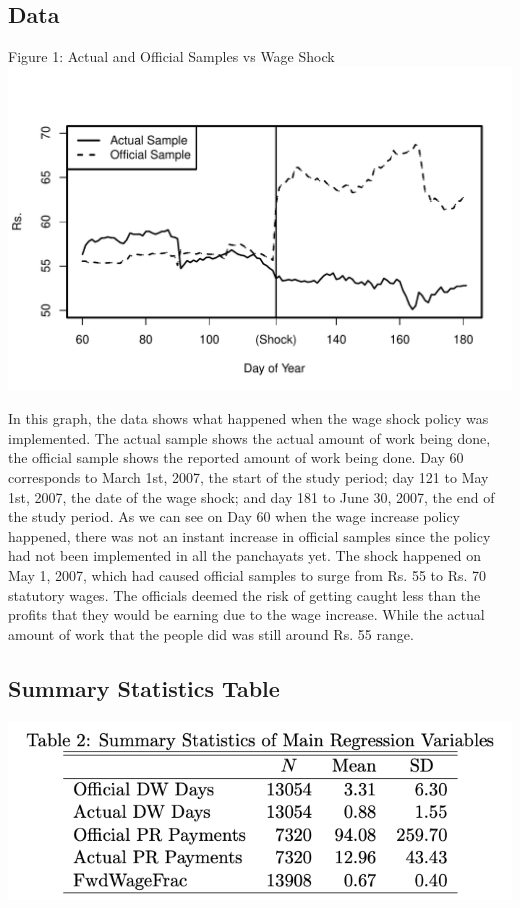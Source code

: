 \documentclass[12pt]{article}
\begin{document}
\subsection{Data}
\begin{center}
Figure 1: Actual and Official Samples vs Wage Shock 
\includegraphics[scale=0.9]{wagetrends2.pdf}
\end{center}

In this graph, the data shows what happened when the wage shock policy was implemented. The actual sample shows the actual amount of work being done, the official sample shows the reported amount of work being done. Day 60 corresponds to March 1st, 2007, the start of the study period; day 121 to May 1st, 2007, the date of the wage shock; and day 181 to June 30, 2007, the end of the study period. As we can see on Day 60 when the wage increase policy happened, there was not an instant increase in official samples since the policy had not been implemented in all the panchayats yet. The shock happened on May 1, 2007, which had caused official samples to surge from Rs. 55 to Rs. 70 statutory wages. The officials deemed the risk of getting caught less than the profits that they would be earning due to the wage increase. While the actual amount of work that the people did was still around Rs. 55 range.
\subsection{Summary Statistics Table}
\begin{center}
\includegraphics[scale=0.45]{Table2.png}
\end{center}
\end{document}
